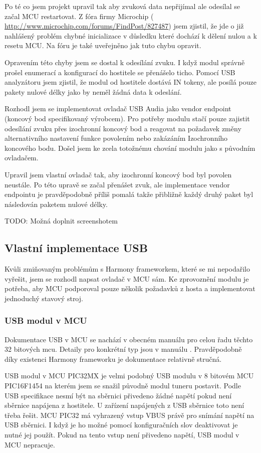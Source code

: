 Po té co jsem projekt upravil tak aby zvuková data nepřijímal ale odesílal se začal MCU restartovat. Z fóra firmy Microchip ( \url{http://www.microchip.com/forums/FindPost/827487}) jsem zjistil, že jde o již nahlášený problém chybné inicializace v důsledku které dochází k dělení nulou a k resetu MCU. Na fóru je také uveřejněno jak tuto chybu opravit.

Opravením této chyby jsem se dostal k odesílání zvuku. I když modul správně prošel enumerací a konfigurací do hostitele se přenášelo ticho. Pomocí USB analyzátoru jsem zjistil, že modul od hostitele dostává IN tokeny, ale posílá pouze pakety nulové délky jako by neměl žádná data k odeslání. 

Rozhodl jsem se implementovat ovladač USB Audia jako vendor endpoint (koncový bod specifikovaný výrobcem). Pro potřeby modulu stačí pouze zajistit odesílání zvuku přes izochronní koncový bod a reagovat na požadavek změny alternativního nastavení funkce povolením nebo zakázáním Izochronního koncového bodu. Došel jsem ke zcela totožnému chování modulu jako s původním ovladačem.

Upravil jsem vlastní ovladač tak, aby izochronní koncový bod byl povolen neustále. Po této upravě se začal přenášet zvuk, ale implementace vendor endpointu je pravděpodobně příliš pomalá takže přibližně každý druhý paket byl následován paketem nulové délky.

TODO: Možná doplnit screenshotem

\subsection{Vlastní implementace USB}
Kvůli zmiňovaným problémům s Harmony frameworkem, které se mi nepodařilo vyřešit, jsem se rozhodl napsat ovladač v MCU sám. Ke zprovoznění modulu je potřeba, aby MCU podporoval pouze několik požadavků z hosta a implementovat jednoduchý stavový stroj.

\subsubsection{USB modul v MCU}
Dokumentace USB v MCU se nachází v obecném manuálu \cite{pic-usb} pro celou řadu těchto 32 bitových mcu. Detaily pro konkrétní typ jsou v manuálu \cite{pic}. Pravděpodobně díky existenci Harmony frameworku je dokumentace relativně stručná.

USB modul v MCU PIC32MX je velmi podobný USB modulu v 8 bitovém MCU PIC16F1454 na kterém jsem se snažil původně modul tuneru postavit. Podle USB specifikace nesmí být na sběrnici přivedeno žádné napětí pokud není sběrnice napájena z hostitele. U zařízení napájených z USB sběrnice toto není třeba řešit. MCU PIC32 má vyhrazený vstup VBUS právě pro snímání napětí na USB sběrnici. I když je ho možné pomocí konfiguračních slov deaktivovat je nutné jej použít. Pokud na tento vstup není přivedeno napětí, USB modul v MCU nepracuje.

